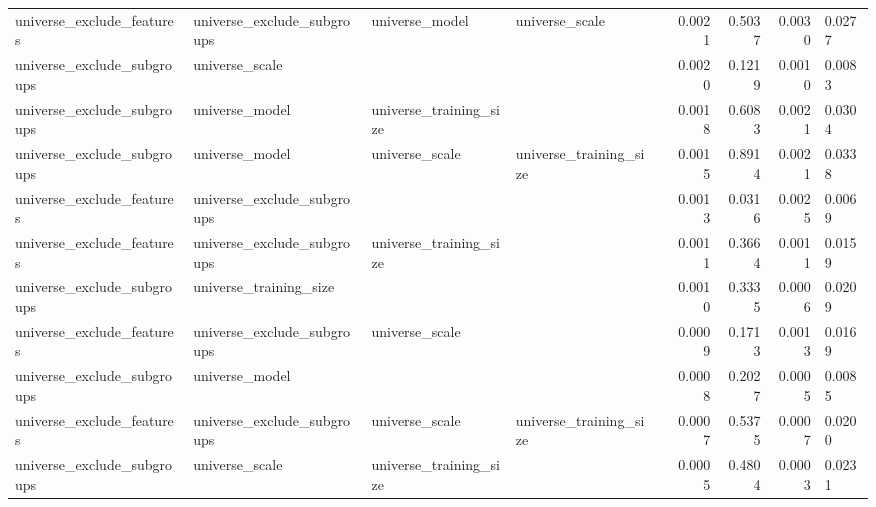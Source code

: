 \begin{table}
\begin{tabular}{llllrrrr}
 universe_exclude_features & universe_exclude_subgroups &         universe_model &         universe_scale &                        &                0.0021 &           0.5037 &         0.0030 &    0.0277 \\
universe_exclude_subgroups &             universe_scale &                        &                        &                        &                0.0020 &           0.1219 &         0.0010 &    0.0083 \\
universe_exclude_subgroups &             universe_model & universe_training_size &                        &                        &                0.0018 &           0.6083 &         0.0021 &    0.0304 \\
universe_exclude_subgroups &             universe_model &         universe_scale & universe_training_size &                        &                0.0015 &           0.8914 &         0.0021 &    0.0338 \\
 universe_exclude_features & universe_exclude_subgroups &                        &                        &                        &                0.0013 &           0.0316 &         0.0025 &    0.0069 \\
 universe_exclude_features & universe_exclude_subgroups & universe_training_size &                        &                        &                0.0011 &           0.3664 &         0.0011 &    0.0159 \\
universe_exclude_subgroups &     universe_training_size &                        &                        &                        &                0.0010 &           0.3335 &         0.0006 &    0.0209 \\
 universe_exclude_features & universe_exclude_subgroups &         universe_scale &                        &                        &                0.0009 &           0.1713 &         0.0013 &    0.0169 \\
universe_exclude_subgroups &             universe_model &                        &                        &                        &                0.0008 &           0.2027 &         0.0005 &    0.0085 \\
 universe_exclude_features & universe_exclude_subgroups &         universe_scale & universe_training_size &                        &                0.0007 &           0.5375 &         0.0007 &    0.0200 \\
universe_exclude_subgroups &             universe_scale & universe_training_size &                        &                        &                0.0005 &           0.4804 &         0.0003 &    0.0231 \\
\bottomrule
\end{tabular}
\end{table}
